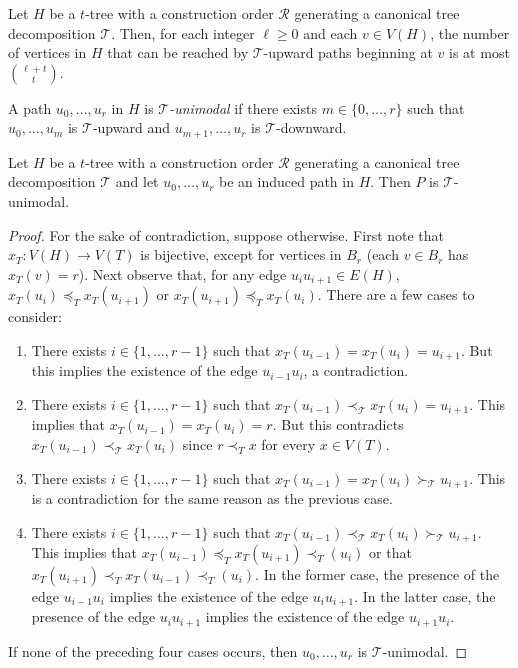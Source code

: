 \documentclass[kpfonts]{patmorin}
\theoremstyle{named}
\begin{document}
\begin{lem}\label{upward-count}
    Let $H$ be a $t$-tree with a construction order $\mathcal{R}$ generating a canonical tree decomposition $\mathcal{T}$.  Then, for each integer $\ell\ge 0$ and each $v\in V(H)$, the number of vertices in $H$ that can be reached by $\mathcal{T}$-upward paths beginning at $v$ is at most $\binom{\ell+t}{t}$.
\end{lem}

A path $u_0,\ldots,u_r$ in $H$ is \emph{$\mathcal{T}$-unimodal} if there exists $m\in\{0,\ldots,r\}$ such that $u_0,\ldots,u_m$ is $\mathcal{T}$-upward and $u_{m+1},\ldots,u_r$ is $\mathcal{T}$-downward.

\begin{lem}\label{induced-unimodal}
    Let $H$ be a $t$-tree with a construction order $\mathcal{R}$ generating a canonical tree decomposition $\mathcal{T}$ and let $u_0,\ldots,u_r$ be an induced path in $H$.  Then $P$ is $\mathcal{T}$-unimodal.
\end{lem}

\begin{proof}
    For the sake of contradiction, suppose otherwise.  First note that $x_T:V(H)\to V(T)$ is bijective, except for vertices in $B_r$ (each $v\in B_r$ has $x_T(v)=r$).  Next observe that, for any edge $u_iu_{i+1}\in E(H)$, $x_T(u_i)\preceq_T x_T(u_{i+1})$ or $x_T(u_{i+1})\preceq_T x_T(u_{i})$.  There are a few cases to consider:
    \begin{enumerate}
        \item There exists $i\in\{1,\ldots,r-1\}$ such that $x_T(u_{i-1})= x_T(u_i)= u_{i+1}$.  But this implies the existence of the edge $u_{i-1}u_i$, a contradiction.

        \item There exists $i\in\{1,\ldots,r-1\}$ such that $x_T(u_{i-1})\prec_\mathcal{T} x_T(u_i)= u_{i+1}$.  This implies that $x_T(u_{i-1})=x_T(u_{i})=r$.  But this contradicts $x_T(u_{i-1})\prec_\mathcal{T} x_T(u_i)$ since $r\prec_T x$ for every $x\in V(T)$.

        \item There exists $i\in\{1,\ldots,r-1\}$ such that $x_T(u_{i-1})= x_T(u_i)\succ_\mathcal{T} u_{i+1}$.  This is a contradiction for the same reason as the previous case.

        \item There exists $i\in\{1,\ldots,r-1\}$ such that $x_T(u_{i-1}) \prec_\mathcal{T} x_T(u_i)\succ_\mathcal{T} u_{i+1}$.  This implies that $x_T(u_{i-1})\preceq_T x_T(u_{i+1}) \prec_T(u_{i})$ or that
        $x_T(u_{i+1})\prec_T x_T(u_{i-1}) \prec_T(u_{i})$.  In the former case, the presence of the edge $u_{i-1}u_i$ implies the existence of the edge $u_iu_{i+1}$. In the latter case, the presence of the edge $u_{i}u_{i+1}$ implies the existence of the edge $u_{i+1}u_i$.
    \end{enumerate}
    If none of the preceding four cases occurs, then $u_0,\ldots,u_r$ is $\mathcal{T}$-unimodal.
\end{proof}
\end{document}
